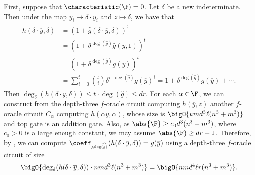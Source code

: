 \documentclass[letterpaper, 11pt]{amsart}
\begin{document}
\begin{pf}
    First, suppose that $\characteristic(\F) = 0$.
    Let $\delta$ be a new indeterminate.
    Then under the map $y_i \mapsto \delta \cdot y_i$ and $z \mapsto \delta$, we have that
    \begin{gather}
    \begin{aligned}\label{eq:det_computation_char_0}
        h(\delta \cdot \overline{y}, \delta) &=  (1 + \widehat{g}(\delta \cdot \overline{y}, \delta))^t \\
                                             &=  (1 + \delta^{\deg(\widehat{g})} \widehat{g}(\overline{y}, 1))^t \\
                                             &= (1 + \delta^{\deg(\widehat{g})} g(\overline{y}))^t \\
                                             &= \sum_{i = 0}^t \binom{t}{i} \delta^{i \cdot \deg(\widehat{g})} g(\overline{y})^i = 1 +  \delta^{\deg(\widehat{g})} g(\overline{y}) + \cdots.
    \end{aligned}
    \end{gather}
    Then $\deg_\delta(h(\delta \cdot \overline{y}, \delta)) \leq t \cdot \deg(\widehat{g}) \leq dr$.
    For each $\alpha\in\F$, we can construct from the depth-three $f$-oracle circuit computing $h(\overline{y},z)$ another $f$-oracle circuit $C_\alpha$ computing $h(\alpha \overline{y}, \alpha)$, whose size is $\bigO{nmd^3\ell(n^3+m^3)}$ and top gate is an addition gate.
    Also, as $\abs{\F} \geq c_0 d^3(n^3+m^3)$, where $c_0>0$ is a large enough constant, we may assume $\abs{\F} \geq dr+1$.
    Therefore, by , we can compute $\coeff_{\delta^{\deg(\widehat{g})}}(h(\delta\cdot \overline{y},\delta))=g(\overline{y})$ using a depth-three $f$-oracle circuit of size 
    \[
    \bigO{\deg_\delta(h(\delta \cdot \overline{y}, \delta))\cdot nmd^3\ell(n^3+m^3)}=\bigO{nmd^4\ell r(n^3+m^3)}.
    \]


\end{pf}
\end{document}
